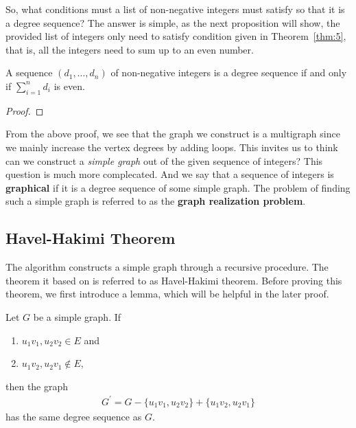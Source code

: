\documentclass[thmcnt=section, 12pt, color=cyan]{my-elegantbook}
\begin{document}
So, what conditions must a list of non-negative integers
must satisfy so that it is a degree sequence?
The answer is simple,
as the next proposition will show,
the provided list of integers only need to satisfy 
condition given in Theorem~\ref{thm:5}, that is, 
all the integers need to sum up to an even number. 

\begin{proposition} \label{pro:10}
	A sequence $(d_1, \ldots, d_n)$ of non-negative integers
	is a degree sequence if and only if 
	$\sum_{i=1}^n d_i$ is even.
\end{proposition}

\begin{proof}
\end{proof}

From the above proof, we see that
the graph we construct is a multigraph
since we mainly increase the vertex degrees by adding loops.
This invites us to think can we 
construct a \textit{simple graph}
out of the given sequence of integers?
This question is much more complecated.
And we say that a sequence of integers 
is \textbf{graphical}
if it is a degree sequence of some simple graph.
The problem of finding such a simple graph
is referred to as 
the \textbf{graph realization problem}.


\subsection{Havel-Hakimi Theorem}

The algorithm \parencite{hakimiRealizabilitySetIntegers1962}
constructs a simple graph 
through a recursive procedure.
The theorem it based on is referred to 
as Havel-Hakimi theorem.
Before proving this theorem, 
we first introduce a lemma, 
which will be helpful in the later proof.

\begin{lemma} \label{lem:2}
	Let $G$ be a simple graph.
	If
	\begin{enumerate}
		\item $u_1 v_1, u_2 v_2 \in E$ and 
		\item $u_1 v_2, u_2 v_1 \notin E$,
	\end{enumerate}
	then the graph
	\begin{align*}
		G^\prime = G - \{u_1 v_1, u_2 v_2\}
		+ \{u_1 v_2, u_2 v_1\}
	\end{align*}
	has the same degree sequence as $G$.
\end{lemma}
\end{document}
